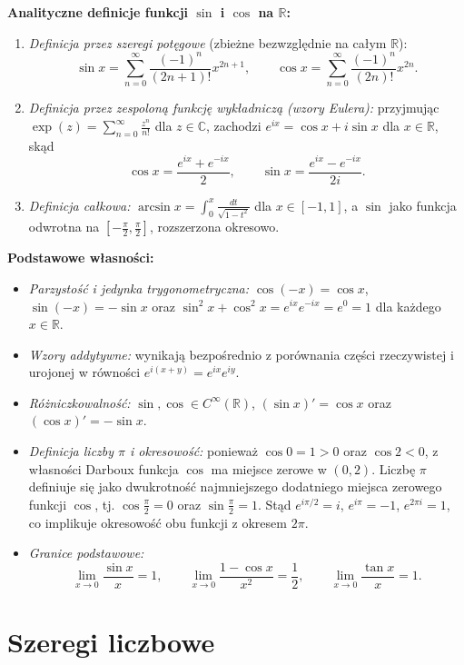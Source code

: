 \documentclass[11pt, a4paper]{article}
\theoremstyle{plain}
\theoremstyle{definition}
\begin{document}
\noindent\textbf{Analityczne definicje funkcji $\sin$ i $\cos$ na $\mathbb{R}$:}
\begin{enumerate}
    \item \emph{Definicja przez szeregi potęgowe} (zbieżne bezwzględnie na całym $\mathbb{R}$):
    \[
    \sin x = \sum_{n=0}^{\infty} \frac{(-1)^n}{(2n+1)!} x^{2n+1}, \qquad \cos x = \sum_{n=0}^{\infty} \frac{(-1)^n}{(2n)!} x^{2n}.
    \]
    \item \emph{Definicja przez zespoloną funkcję wykładniczą (wzory Eulera):} przyjmując $\exp(z) = \sum_{n=0}^\infty \frac{z^n}{n!}$ dla $z \in \mathbb{C}$, zachodzi $e^{ix} = \cos x + i\sin x$ dla $x \in \mathbb{R}$, skąd
    \[
    \cos x = \frac{e^{ix} + e^{-ix}}{2}, \qquad \sin x = \frac{e^{ix} - e^{-ix}}{2i}.
    \]
    \item \emph{Definicja całkowa:} $\arcsin x = \int_0^x \frac{dt}{\sqrt{1 - t^2}}$ dla $x \in [-1, 1]$, a $\sin$ jako funkcja odwrotna na $[-\frac{\pi}{2}, \frac{\pi}{2}]$, rozszerzona okresowo.
\end{enumerate}

\noindent\textbf{Podstawowe własności:}
\begin{itemize}
    \item \emph{Parzystość i jedynka trygonometryczna:} $\cos(-x) = \cos x$, $\sin(-x) = -\sin x$ oraz $\sin^2 x + \cos^2 x = e^{ix}e^{-ix} = e^0 = 1$ dla każdego $x \in \mathbb{R}$.
    \item \emph{Wzory addytywne:} wynikają bezpośrednio z porównania części rzeczywistej i urojonej w równości $e^{i(x+y)} = e^{ix} e^{iy}$.
    \item \emph{Różniczkowalność:} $\sin, \cos \in C^\infty(\mathbb{R})$, $(\sin x)' = \cos x$ oraz $(\cos x)' = -\sin x$.
    \item \emph{Definicja liczby $\pi$ i okresowość:} ponieważ $\cos 0 = 1 > 0$ oraz $\cos 2 < 0$, z własności Darboux funkcja $\cos$ ma miejsce zerowe w $(0, 2)$. Liczbę $\pi$ definiuje się jako dwukrotność najmniejszego dodatniego miejsca zerowego funkcji $\cos$, tj. $\cos\frac{\pi}{2} = 0$ oraz $\sin\frac{\pi}{2} = 1$. Stąd $e^{i\pi/2} = i$, $e^{i\pi} = -1$, $e^{2\pi i} = 1$, co implikuje okresowość obu funkcji z okresem $2\pi$.
    \item \emph{Granice podstawowe:}
    \[
    \lim_{x\to 0} \frac{\sin x}{x} = 1, \qquad \lim_{x\to 0} \frac{1 - \cos x}{x^2} = \frac{1}{2}, \qquad \lim_{x\to 0} \frac{\tan x}{x} = 1.
    \]
\end{itemize}

\section{Szeregi liczbowe}
\end{document}
